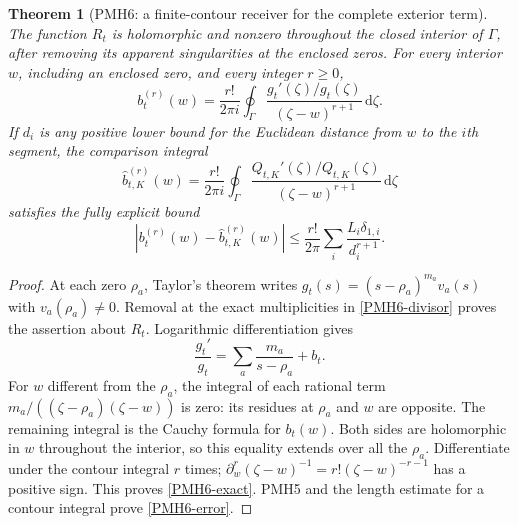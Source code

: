 \documentclass[11pt]{article}
\newtheorem{theorem}{Theorem}
\newcommand{\dd}{\,\mathrm d}
\begin{document}
\begin{theorem}[PMH6: a finite-contour receiver for the complete exterior term]
\label{PMH6}
The function $R_t$ is holomorphic and nonzero throughout the closed
interior of $\Gamma$, after removing its apparent singularities at
the enclosed zeros. For every interior $w$, including an enclosed
zero, and every integer $r\ge0$,
\begin{equation}\label{PMH6-exact}
 b_t^{(r)}(w)=\frac{r!}{2\pi i}\oint_\Gamma
       \frac{g_t'(\zeta)/g_t(\zeta)}{(\zeta-w)^{r+1}}\dd\zeta.
\end{equation}
If $d_i$ is any positive lower bound for the Euclidean distance
from $w$ to the $i$th segment, the comparison integral
\begin{equation}\label{PMH6-approx}
 \widehat b_{t,K}^{(r)}(w)=\frac{r!}{2\pi i}\oint_\Gamma
       \frac{Q_{t,K}'(\zeta)/Q_{t,K}(\zeta)}{(\zeta-w)^{r+1}}\dd\zeta
\end{equation}
satisfies the fully explicit bound
\begin{equation}\label{PMH6-error}
 |b_t^{(r)}(w)-\widehat b_{t,K}^{(r)}(w)|
 \le\frac{r!}{2\pi}\sum_i\frac{L_i\delta_{1,i}}{d_i^{r+1}}.
\end{equation}
\end{theorem}
\begin{proof}
At each zero $\rho_a$, Taylor's theorem writes
$g_t(s)=(s-\rho_a)^{m_a}v_a(s)$ with $v_a(\rho_a)\ne0$.
Removal at the exact multiplicities in \eqref{PMH6-divisor} proves
the assertion about $R_t$. Logarithmic differentiation gives
\[
 \frac{g_t'}{g_t}=\sum_a\frac{m_a}{s-\rho_a}+b_t.
\]
For $w$ different from the $\rho_a$, the integral of each rational
term $m_a/((\zeta-\rho_a)(\zeta-w))$ is zero: its residues at
$\rho_a$ and $w$ are opposite. The remaining integral is the
Cauchy formula for $b_t(w)$. Both sides are holomorphic in $w$
throughout the interior, so this equality extends over all the
$\rho_a$. Differentiate under the contour integral $r$ times;
$\partial_w^r(\zeta-w)^{-1}=r!(\zeta-w)^{-r-1}$ has a positive
sign. This proves \eqref{PMH6-exact}. PMH5 and the length estimate
for a contour integral prove \eqref{PMH6-error}.
\end{proof}
\end{document}
